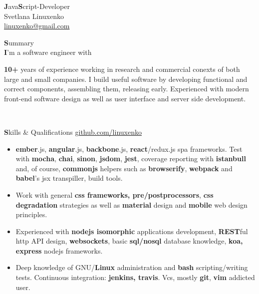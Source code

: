 \documentclass[a4paper,12pt]{article}
\begin{document}
\begin{center}
  {\huge \textbf{J}ava\textbf{S}cript-Developer}\\\medskip
  {\Large Svetlana Linuxenko}\\\medskip
  \href{mailto:linuxenko@gmail.com}{linuxenko@gmail.com} \\\medskip
\end{center}

%
%

{\large \textbf{S}ummary}\\

\textbf{I}'m a software engineer with {\textbf {\small{10+}} years of experience working in research and commercial
conexts of both large and small companies. I build useful software by developing functional and correct
components, assembling them, releasing early. Experienced with modern front-end software design as well as
user interface and server side development.

\\\bigskip

%
%

{\large \textbf{S}kills \& Qualifications} \hfill \href{https://github.com/linuxenko}{github.com/linuxenko}

\begin{itemize}[itemsep=-2pt]
  \item \textbf{ember}.js, \textbf{angular}.js, \textbf{backbone}.js, \textbf{react}/redux.js spa frameworks.
    Test with \textbf{mocha}, \textbf{chai}, \textbf{sinon}, \textbf{jsdom}, \textbf{jest}, coverage reporting with \textbf{istanbull} and, of course,
    \textbf{commonjs} helpers such as \textbf{browserify}, \textbf{webpack} and \textbf{babel}'s jsx transpiller, build tools.

  \item Work with general \textbf{css frameworks, pre/postprocessors},  \textbf{css degradation} strategies as
    well as \textbf{material} design and \textbf{mobile} web design principles.

  \item Experienced with \textbf{nodejs isomorphic} applications development, \textbf{REST}ful http API design, \textbf{websockets},
    basic \textbf{sql/nosql} database knowledge, \textbf{koa, express} nodejs frameworks.

  \item Deep knowledge of GNU/\textbf{Linux} administration and \textbf{bash} scripting/writing tests. Continuous integration: \textbf{jenkins, travis}. Vcs, mostly \textbf{git}, \textbf{vim} addicted user.


\end{itemize}}
\end{document}
